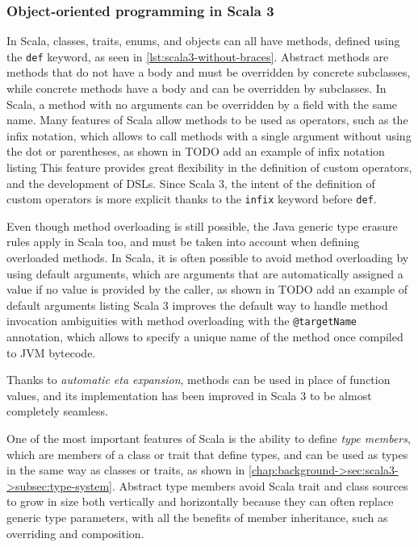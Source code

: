 \subsubsection{Object-oriented programming in Scala 3}

In Scala, classes, traits, enums, and objects can all have methods, defined using the \texttt{def} keyword, as seen in \cref{lst:scala3-without-braces}.
%
Abstract methods are methods that do not have a body and must be overridden by concrete subclasses, while concrete methods have a body and can be overridden by subclasses.
%
In Scala, a method with no arguments can be overridden by a field with the same name.
%
Many features of Scala allow methods to be used as operators, such as the infix notation, which allows to call methods with a single argument without using the dot or parentheses, as shown in 
TODO add an example of infix notation listing
%
This feature provides great flexibility in the definition of custom operators, and the development of \ac{DSL}s.
%
Since Scala 3, the intent of the definition of custom operators is more explicit thanks to the \texttt{infix} keyword before \texttt{def}.

Even though method overloading is still possible, the Java generic type erasure rules apply in Scala too, and must be taken into account when defining overloaded methods.
%
In Scala, it is often possible to avoid method overloading by using default arguments, which are arguments that are automatically assigned a value if no value is provided by the caller, as shown in
TODO add an example of default arguments listing
%
Scala 3 improves the default way to handle method invocation ambiguities with method overloading with the \texttt{@targetName} annotation, which allows to specify a unique name of the method once compiled to \ac{JVM} bytecode.

Thanks to \textit{automatic eta expansion}, methods can be used in place of function values, and its implementation has been improved in Scala 3 to be almost completely seamless.

One of the most important features of Scala is the ability to define \textit{type members},
which are members of a class or trait that define types, and can be used as types in the same way as classes or traits, as shown in \cref{chap:background->sec:scala3->subsec:type-system}.
%
Abstract type members avoid Scala trait and class sources to grow in size both vertically and horizontally because they can often replace generic type parameters, with all the benefits of member inheritance, such as overriding and composition.

